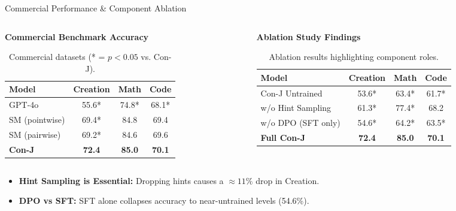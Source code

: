 \documentclass[10pt]{beamer}
\begin{document}
\begin{frame}{Commercial Performance \& Component Ablation}
\begin{columns}[T]
    \begin{column}{0.5\textwidth}
        \textbf{Commercial Benchmark Accuracy}
        \vspace{0.1cm}
        \begin{table}
            \centering
            \tiny
            \begin{tabular}{lccc}
                \toprule
                Model & Creation & Math & Code \\
                \midrule
                GPT-4o & 55.6* & 74.8* & 68.1* \\
                SM (pointwise) & 69.4* & 84.8 & 69.4 \\
                SM (pairwise) & 69.2* & 84.6 & 69.6 \\
                \textbf{Con-J} & \textbf{72.4} & \textbf{85.0} & \textbf{70.1} \\
                \bottomrule
            \end{tabular}
            \caption{Commercial datasets (* = $p < 0.05$ vs. Con-J).}
        \end{table}
    \end{column}
    
    \begin{column}{0.5\textwidth}
        \textbf{Ablation Study Findings}
        \vspace{0.1cm}
        \begin{table}
            \centering
            \tiny
            \begin{tabular}{lccc}
                \toprule
                Model & Creation & Math & Code \\
                \midrule
                Con-J Untrained & 53.6* & 63.4* & 61.7* \\
                w/o Hint Sampling & 61.3* & 77.4* & 68.2 \\
                w/o DPO (SFT only) & 54.6* & 64.2* & 63.5* \\
                \textbf{Full Con-J} & \textbf{72.4} & \textbf{85.0} & \textbf{70.1} \\
                \bottomrule
            \end{tabular}
            \caption{Ablation results highlighting component roles.}
        \end{table}
    \end{column}
\end{columns}

\vspace{0.2cm}
\begin{itemize}
    \item \textbf{Hint Sampling is Essential:} Dropping hints causes a $\approx 11\%$ drop in Creation.
    \item \textbf{DPO vs SFT:} SFT alone collapses accuracy to near-untrained levels (54.6\%).
\end{itemize}
\end{frame}
\end{document}
